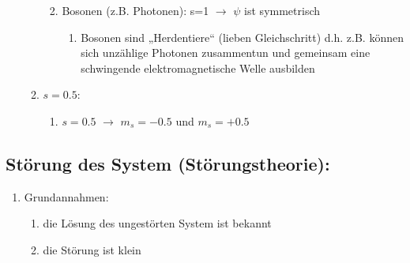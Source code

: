 \begin{enumerate}
\begin{enumerate}
\begin{enumerate}
\begin{enumerate}
    \end{enumerate}
    \item Bosonen (z.B. Photonen): s=1 $\rightarrow$ $\psi$ ist symmetrisch 
    \begin{enumerate}
        \item Bosonen sind „Herdentiere“ (lieben Gleichschritt) d.h. z.B.  können sich unzählige
        Photonen zusammentun und gemeinsam eine schwingende elektromagnetische Welle ausbilden 
    \end{enumerate}
\end{enumerate}
\item $s=0.5$:
\begin{enumerate}
    \item $s=0.5$ $\rightarrow$ $m_s=-0.5$ und $m_s=+0.5$
\end{enumerate}
\end{enumerate}
\end{enumerate}



\subsection{Störung des System (Störungstheorie):}
\begin{enumerate}
    \item Grundannahmen:
    \begin{enumerate}
        \item die Lösung des ungestörten System ist bekannt
        \item die Störung ist klein
    \end{enumerate}
\end{enumerate}